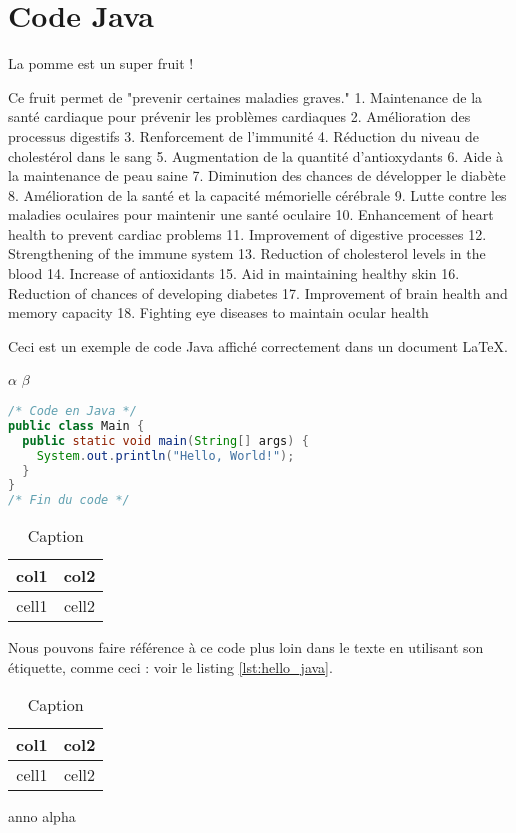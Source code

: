 \documentclass{article}
\begin{document}
\section{Code Java}

La pomme est un super fruit !

Ce fruit permet de "prevenir certaines maladies graves."
1. Maintenance de la santé cardiaque pour prévenir les problèmes cardiaques
2. Amélioration des processus digestifs
3. Renforcement de l'immunité
4. Réduction du niveau de cholestérol dans le sang
5. Augmentation de la quantité d'antioxydants
6. Aide à la maintenance de peau saine
7. Diminution des chances de développer le diabète
8. Amélioration de la santé et la capacité mémorielle cérébrale
9. Lutte contre les maladies oculaires pour maintenir une santé oculaire
10. Enhancement of heart health to prevent cardiac problems
11. Improvement of digestive processes
12. Strengthening of the immune system
13. Reduction of cholesterol levels in the blood
14. Increase of antioxidants
15. Aid in maintaining healthy skin
16. Reduction of chances of developing diabetes
17. Improvement of brain health and memory capacity
18. Fighting eye diseases to maintain ocular health

Ceci est un exemple de code Java affiché correctement dans un document LaTeX.

$\alpha$
$\beta$

\begin{lstlisting}[language=Java, caption={Exemple "Hello, World!" en Java.}, label={lst:hello_java}]
/* Code en Java */
public class Main {
  public static void main(String[] args) {
    System.out.println("Hello, World!");
  }
}
/* Fin du code */
\end{lstlisting}

\begin{table}[h!]
    \centering
    \begin{tabular}{|c|c|}
        \hline
        col1 & col2 \\
        \hline
        cell1 & cell2 \\
        \hline
    \end{tabular}
    \caption{Caption}
    \label{tab:my_label}
\end{table}

Nous pouvons faire référence à ce code plus loin dans le texte en utilisant son étiquette, comme ceci : voir le listing \ref{lst:hello_java}.


\begin{table}[h!]
    \centering
    \begin{tabular}{|c|c|}
        \hline
        col1 & col2 \\
        \hline
        cell1 & cell2 \\
        \hline
    \end{tabular}
    \caption{Caption}
    \label{tab:my_label}
\end{table}

anno	
alpha 		
\end{document}
